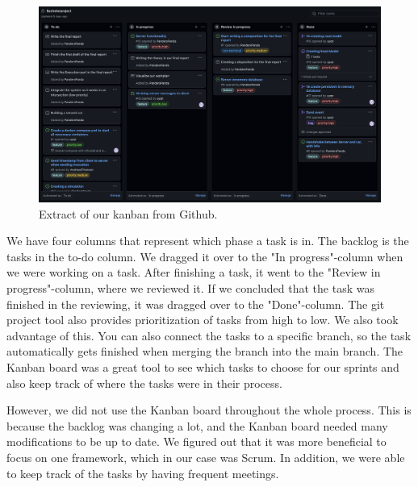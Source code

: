 \begin{figure}[h!]
	\centering
	\includegraphics[width=1\linewidth]{figures/kanban_screenshot}
	\caption[kanban screenshot]{Extract of our kanban from Github.}
	\label{fig:kanbanscreenshot}
\end{figure}

We have four columns that represent which phase a task is in. The backlog is the tasks in the to-do column. We dragged it over to the "In progress"-column when we were working on a task. After finishing a task, it went to the "Review in progress"-column, where we reviewed it. If we concluded that the task was finished in the reviewing, it was dragged over to the "Done"-column. The git project tool also provides prioritization of tasks from high to low. We also took advantage of this. You can also connect the tasks to a specific branch, so the task automatically gets finished when merging the branch into the main branch. The Kanban board was a great tool to see which tasks to choose for our sprints and also keep track of where the tasks were in their process.

However, we did not use the Kanban board throughout the whole process. This is because the backlog was changing a lot, and the Kanban board needed many modifications to be up to date. We figured out that it was more beneficial to focus on one framework, which in our case was Scrum. In addition, we were able to keep track of the tasks by having frequent meetings. 